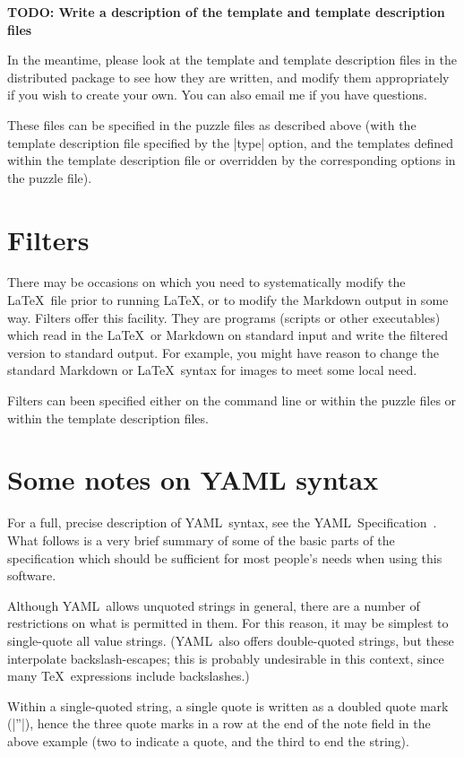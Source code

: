 \documentclass{article}
\def\YAML{{\small YAML}}
\begin{document}
\textbf{TODO: Write a description of the template and template
  description files}

In the meantime, please look at the template and template description
files in the distributed package to see how they are written, and
modify them appropriately if you wish to create your own.  You can
also email me if you have questions.

These files can be specified in the puzzle files as described above
(with the template description file specified by the |type| option,
and the templates defined within the template description file or
overridden by the corresponding options in the puzzle file). 

\section{Filters}
\label{sec:filters}

There may be occasions on which you need to systematically modify the
\LaTeX\ file prior to running \LaTeX, or to modify the Markdown output
in some way.  Filters offer this facility.  They are programs (scripts
or other executables) which read in the \LaTeX\ or Markdown on
standard input and write the filtered version to standard output.  For
example, you might have reason to change the standard Markdown or
\LaTeX\ syntax for images to meet some local need.

Filters can been specified either on the command line or within the
puzzle files or within the template description files.


\section{Some notes on \texorpdfstring{\YAML}{YAML} syntax}

For a full, precise description of \YAML\ syntax, see the \YAML\
Specification~\cite{YAML}.  What follows is a very brief summary of
some of the basic parts of the specification which should be
sufficient for most people's needs when using this software.

Although \YAML\ allows unquoted strings in general, there are a number
of restrictions on what is permitted in them.  For this reason, it may
be simplest to single-quote all value strings.  (\YAML\ also offers
double-quoted strings, but these interpolate backslash-escapes; this
is probably undesirable in this context, since many \TeX\ expressions
include backslashes.)

Within a single-quoted string, a single quote is written as a doubled
quote mark (|''|), hence the three quote marks in a row at the
end of the note field in the above example (two to indicate a quote,
and the third to end the string).
\end{document}

